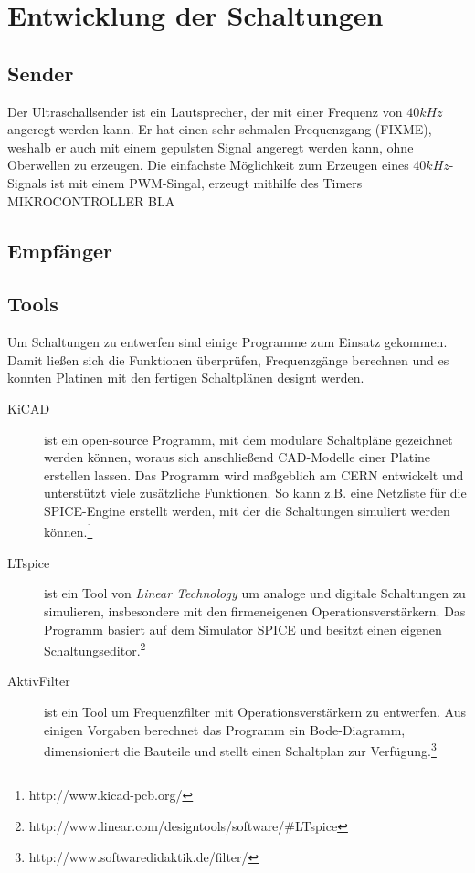 

\chapter{Entwicklung der Schaltungen}



\section{Sender}
Der Ultraschallsender ist ein Lautsprecher, der mit einer Frequenz von $40kHz$ angeregt werden kann. Er hat einen sehr schmalen Frequenzgang (FIXME), weshalb er auch mit einem gepulsten Signal angeregt werden kann, ohne Oberwellen zu erzeugen. Die einfachste Möglichkeit zum Erzeugen eines $40kHz$-Signals ist mit einem \ac{PWM}-Singal, erzeugt mithilfe des Timers MIKROCONTROLLER BLA


\section{Empfänger}


\section{Tools}
Um Schaltungen zu entwerfen sind einige Programme zum Einsatz gekommen. Damit ließen sich die Funktionen überprüfen, Frequenzgänge berechnen und es konnten Platinen mit den fertigen Schaltplänen designt werden.
\begin{description}
	\item[KiCAD] ist ein open-source Programm, mit dem modulare Schaltpläne gezeichnet werden können, woraus sich anschließend CAD-Modelle einer Platine erstellen lassen. Das Programm wird maßgeblich am CERN entwickelt und unterstützt viele zusätzliche Funktionen. So kann z.B. eine Netzliste für die \ac{SPICE}-Engine erstellt werden, mit der die Schaltungen simuliert werden können.\footnote{http://www.kicad-pcb.org/}
	\item[LTspice] ist ein Tool von \textit{Linear Technology} um analoge und digitale Schaltungen zu simulieren, insbesondere mit den firmeneigenen Operationsverstärkern. Das Programm basiert auf dem Simulator \ac{SPICE} und besitzt einen eigenen Schaltungseditor.\footnote{http://www.linear.com/designtools/software/\#LTspice}
	\item[AktivFilter] ist ein Tool um Frequenzfilter mit Operationsverstärkern zu entwerfen. Aus einigen Vorgaben berechnet das Programm ein Bode-Diagramm, dimensioniert die Bauteile und stellt einen Schaltplan zur Verfügung.\footnote{http://www.softwaredidaktik.de/filter/}
\end{description}


